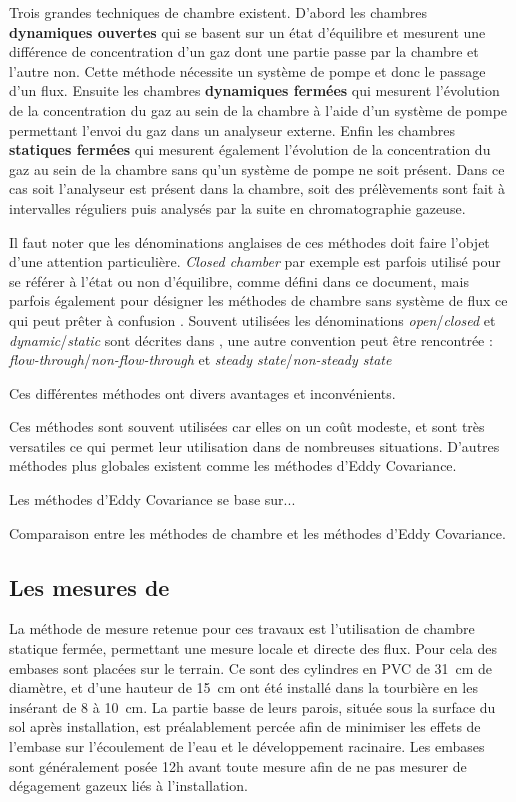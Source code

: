 Trois grandes techniques de chambre existent.
D'abord les chambres \textbf{dynamiques ouvertes} qui se basent sur un état d'équilibre et mesurent une différence de concentration d'un gaz dont une partie passe par la chambre et l'autre non. 
Cette méthode nécessite un système de pompe et donc le passage d'un flux.
Ensuite les chambres \textbf{dynamiques fermées} qui mesurent l'évolution de la concentration du gaz au sein de la chambre à l'aide d'un système de pompe permettant l'envoi du gaz dans un analyseur externe.
Enfin les chambres \textbf{statiques fermées} qui mesurent également l'évolution de la concentration du gaz au sein de la chambre sans qu'un système de pompe ne soit présent.
Dans ce cas soit l'analyseur est présent dans la chambre, soit des prélèvements sont fait à intervalles réguliers puis analysés par la suite en chromatographie gazeuse.

Il faut noter que les dénominations anglaises de ces méthodes doit faire l'objet d'une attention particulière.
\textit{Closed chamber} par exemple est parfois utilisé pour se référer à l'état ou non d'équilibre, comme défini dans ce document, mais parfois également pour désigner les méthodes de chambre sans système de flux ce qui peut prêter à confusion \cite{pumpanen2004}.
Souvent utilisées les dénominations \textit{open}/\textit{closed} et \textit{dynamic}/\textit{static} sont décrites dans \cite{luo2006161}, une autre convention peut être rencontrée : \textit{flow-through}/\textit{non-flow-through} et \textit{steady state}/\textit{non-steady state} \cite{livingston1995}

Ces différentes méthodes ont divers avantages et inconvénients.

Ces méthodes sont souvent utilisées car elles on un coût modeste, et sont très versatiles ce qui permet leur utilisation dans de nombreuses situations.
D'autres méthodes plus globales existent comme les méthodes d'Eddy Covariance.

Les méthodes d'Eddy Covariance se base sur...

Comparaison entre les méthodes de chambre et les méthodes d'Eddy Covariance.

\subsection{Les mesures de \coo}

La méthode de mesure retenue pour ces travaux est l'utilisation de chambre statique fermée, permettant une mesure locale et directe des flux.
Pour cela des embases sont placées sur le terrain.
Ce sont des cylindres en PVC de \SI{31}{\centi\metre} de diamètre, et d'une hauteur de \SI{15}{\centi\metre} ont été installé dans la tourbière en les insérant de 8 à \SI{10}{\centi\metre}.
La partie basse de leurs parois, située sous la surface du sol après installation, est préalablement percée afin de minimiser les effets de l'embase sur l'écoulement de l'eau et le développement racinaire.
Les embases sont généralement posée 12h avant toute mesure afin de ne pas mesurer de dégagement gazeux liés à l'installation.

